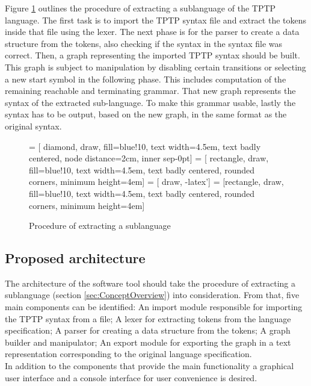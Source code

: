 Figure \ref{fig:ConceptProcessSublanguage} outlines the procedure of extracting a sublanguage of the \ac{TPTP} language.
The first task is to import the \ac{TPTP} syntax file and extract the tokens inside that file using the lexer.
The next phase is for the parser to create a data structure from the tokens, also checking if the syntax in the syntax file was correct.
Then, a graph representing the imported \ac{TPTP} syntax should be built.\\
This graph is subject to manipulation by disabling certain transitions or selecting a new start symbol in the following phase.
This includes computation of the remaining reachable and terminating grammar.
That new graph represents the syntax of the extracted sub-language.
To make this grammar usable, lastly the syntax has to be output, based on the new graph, in the same format as the original syntax.
\begin{figure}[H]
 = [ diamond, draw, fill=blue!10, text width=4.5em, text badly centered, node distance=2cm, inner sep-0pt]  
 = [ rectangle, draw, fill=blue!10, text width=4.5em, text badly centered, rounded corners, minimum height=4em]  
 = [ draw, -latex']  
 = [rectangle, draw, fill=blue!10, text width=4.5em, text badly centered, rounded corners, minimum height=4em]  
\begin{center}
\end{center}
\caption{Procedure of extracting a sublanguage}
\label{fig:ConceptProcessSublanguage}
\end{figure}

\subsection{Proposed architecture}\label{sec:ConceptProposedArchitecture}
The architecture of the software tool should take the procedure of extracting a sublanguage (section \ref{sec:ConceptOverview}) into consideration.
From that, five main components can be identified:
An import module responsible for importing the \ac{TPTP} syntax from a file;
A lexer for extracting tokens from the language specification; A parser for creating a data structure from the tokens;
A graph builder and manipulator;
An export module for exporting the graph in a text representation corresponding to the original language specification.\\
In addition to the components that provide the main functionality a graphical user interface and a console interface for user convenience is desired.

